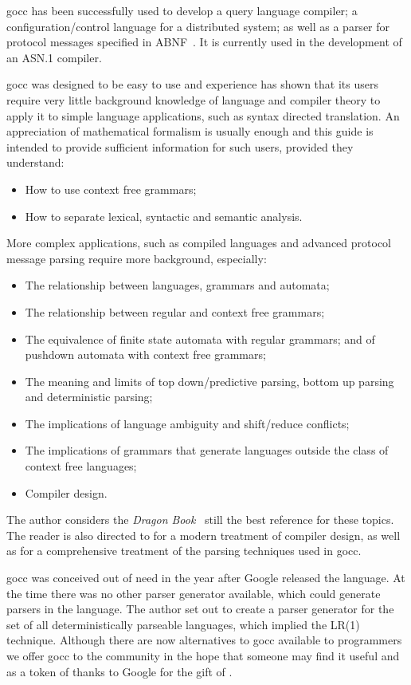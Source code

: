 \documentclass[12pt]{article}
\begin{document}
	gocc has been successfully used to develop a query language compiler; a configuration/control language for a distributed system; as well as a parser for protocol messages specified in ABNF~\cite{ABNF}. It is currently used in the development of an ASN.1 compiler.

	gocc was designed to be easy to use and experience has shown that its users require very little background knowledge of language and compiler theory to apply it to simple language applications, such as syntax directed translation. An appreciation of mathematical formalism is usually enough and this guide is intended to provide sufficient information for such users, provided they understand:
	\begin{itemize}
		\item How to use context free grammars;
		\item How to separate lexical, syntactic and semantic analysis.
	\end{itemize}

	More complex applications, such as compiled languages and advanced protocol message parsing require more background, especially:
	\begin{itemize}
		\item The relationship between languages, grammars and automata;
		\item The relationship between regular and context free grammars;
		\item The equivalence of finite state automata with regular grammars; and of pushdown automata with context free grammars;
		\item The meaning and limits of top down/predictive parsing, bottom up parsing and deterministic parsing;
		\item The implications of language ambiguity and shift/reduce conflicts;
		\item The implications of grammars that generate languages outside the class of context free languages;
		\item Compiler design.
	\end{itemize}

	The author  considers the {\em Dragon Book}~\cite{Dragon Book} still the best reference for these topics. The reader is also directed to \cite{Modern Compiler Design} for a modern treatment of compiler design, as well as \cite{Parsing} for a comprehensive treatment of the parsing techniques used in gocc.

	gocc was conceived out of need in the year after Google released the \Go language. At the time there was no other parser generator available, which could generate parsers in the \Go language. The author set out to create a parser generator for the set of all deterministically parseable languages, which implied the LR(1) technique. Although there are now alternatives to gocc available to \Go programmers we offer gocc to the community in the hope that someone may find it useful and as a token of thanks to Google for the gift of \Go.
\end{document}
